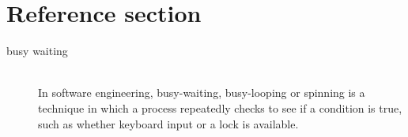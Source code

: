 \documentclass{article}
\begin{document}
\pagebreak
\section*{Reference section} \label{sec:reference}
\begin{description}
	\item[busy waiting] \hfill \\ In software engineering, busy-waiting, busy-looping or spinning is a technique in which a process repeatedly checks to see if a condition is true, such as whether keyboard input or a lock is available.
\end{description}
\end{document}
